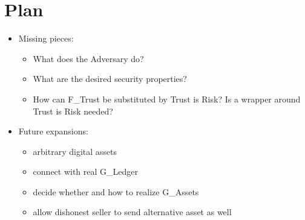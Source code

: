 \section{Plan}
  \begin{itemize}
    \item Missing pieces:
    \begin{itemize}
      \item What does the Adversary do?
      \item What are the desired security properties?
      \item How can F\_Trust be substituted by Trust is Risk? Is a wrapper around Trust is
      Risk needed?
    \end{itemize}
    \item Future expansions:
    \begin{itemize}
      \item arbitrary digital assets
      \item connect with real G\_Ledger
      \item decide whether and how to realize G\_Assets
      \item allow dishonest seller to send alternative asset as well
    \end{itemize}
  \end{itemize}
